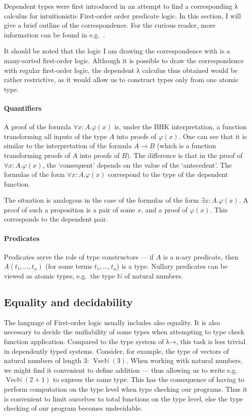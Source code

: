 \documentclass[12pt]{article}
\begin{document}
Dependent types were first introduced in an attempt to find a corresponding λ calculus for intuitionistic First-order order predicate logic. In this section, I will give a brief outline of the correspondence. For the curious reader, more information can be found in e.g.~\cite{sorensen2006lectures}.

It should be noted that the logic I am drawing the correspondence with is a many-sorted first-order logic. Although it is possible to draw the correspondence with regular first-order logic, the dependent λ calculus thus obtained would be rather restrictive, as it would allow us to construct types only from one atomic type.


\paragraph{Quantifiers}
A proof of the formula $∀x:A.φ(x)$ is, under the BHK interpretation, a function transforming all inputs of the type $A$ into proofs of $φ(x)$. One can see that it is similar to the interpretation of the formula $A → B$ (which is a function transforming proofs of $A$ into proofs of $B$). The difference is that in the proof of $∀x:A.φ(x)$, the `consequent' depends on the value of the `antecedent'. The formulas of the form $∀x:A.φ(x)$ correspond to the type of the dependent function.

The situation is analogous in the case of the formulas of the form $∃x:A.φ(x)$. A proof of such a proposition is a pair of some $x$, and a proof of $φ(x)$. This corresponds to the dependent pair.

\paragraph{Predicates}
Predicates serve the role of type constructors — if $A$ is a n-ary predicate, then $A(t₁, …, t_n)$ (for some terms $t₁, …, t_n$) is a type. Nullary predicates can be viewed as atomic types, e.g.~the type $ℕ$ of natural numbers.

\subsection{Equality and decidability}
The language of First-order logic usually includes also equality. It is also necessary to decide the unifiability of some types when attempting to type check function application. Compared to the type system of λ→, this task is less trivial in dependently typed systems. Consider, for example, the type of vectors of natural numbers of length 3: $\operatorname{Vecℕ}(3)$. When working with natural numbers, we might find it convenient to define addition — thus allowing us to write e.g.~$\operatorname{Vecℕ}(2 + 1)$ to express the same type. This has the consequence of having to perform computation on the type level when type checking our programs. Thus it is convenient to limit ourselves to total functions on the type level, else the type checking of our program becomes undecidable.
\end{document}
